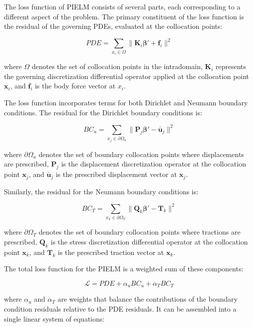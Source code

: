 \documentclass[11pt]{article}
\begin{document}
The loss function of PIELM consists of several parts, each corresponding to a different aspect of the problem. The primary constituent of the loss function is the residual of the governing PDEs, evaluated at the collocation points:

\begin{equation}
PDE = \sum_{x_i \in \Omega} \| \mathbf{K}_i\boldsymbol{\beta}' + \mathbf{f}_i \|^2
\end{equation}

where $\Omega$ denotes the set of collocation points in the intradomain, $\mathbf{K}_i$ represents the governing discretization differential operator applied at the collocation point $\mathbf{x}_i$, and $\mathbf{f}_i$ is the body force vector at $x_i$.

The loss function incorporates terms for both Dirichlet and Neumann boundary conditions. The residual for the Dirichlet boundary conditions is:

\begin{equation}
BC_u = \sum_{x_j \in \partial\Omega_u} \| \mathbf{P}_j\boldsymbol{\beta}' - \bar{\mathbf{u}}_j \|^2
\end{equation}

where $\partial\Omega_u$ denotes the set of boundary collocation points where displacements are prescribed, $\mathbf{P}_j$ is the displacement discretization operator at the collocation point $\mathbf{x}_j$, and $\bar{\mathbf{u}}_j$ is the prescribed displacement vector at $\mathbf{x}_j$.

Similarly, the residual for the Neumann boundary conditions is:

\begin{equation}
BC_T = \sum_{x_k \in \partial\Omega_T} \| \mathbf{Q}_k\boldsymbol{\beta}' - \mathbf{T}_k \|^2
\end{equation}

where $\partial\Omega_T$ denotes the set of boundary collocation points where tractions are prescribed, $\mathbf{Q}_k$ is the stress discretization differential operator at the collocation point $\mathbf{x}_k$, and $\mathbf{T}_k$ is the prescribed traction vector at $\mathbf{x}_k$.

The total loss function for the PIELM is a weighted sum of these components:

\begin{equation}
\mathcal{L} = PDE + \alpha_u BC_u + \alpha_T BC_T
\end{equation}

where $\alpha_u$ and $\alpha_T$ are weights that balance the contributions of the boundary condition residuals relative to the PDE residuals. It can be assembled into a single linear system of equations:
\end{document}
